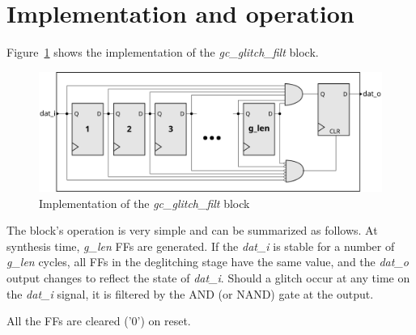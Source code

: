 \documentclass[a4paper,11pt]{article}
\begin{document}
\pagebreak
\section{Implementation and operation}

Figure~\ref{fig:implem} shows the implementation of the \textit{gc\_glitch\_filt}
block.

\begin{figure}[h]
  \centerline{\includegraphics[width=\textwidth]{fig/implem}}
  \caption{Implementation of the \textit{gc\_glitch\_filt} block}
  \label{fig:implem}
\end{figure}

The block's operation is very simple and can be summarized as follows. At synthesis
time, \textit{g\_len} FFs are generated. If the \textit{dat\_i} is stable for a number
of \textit{g\_len} cycles, all FFs in the deglitching stage have the same value,
and the \textit{dat\_o} output changes to reflect the state of \textit{dat\_i}.
Should a glitch occur at any time on the \textit{dat\_i} signal, it is filtered
by the AND (or NAND) gate at the output.

All the FFs are cleared ('0') on reset.

\pagebreak


\end{document}
